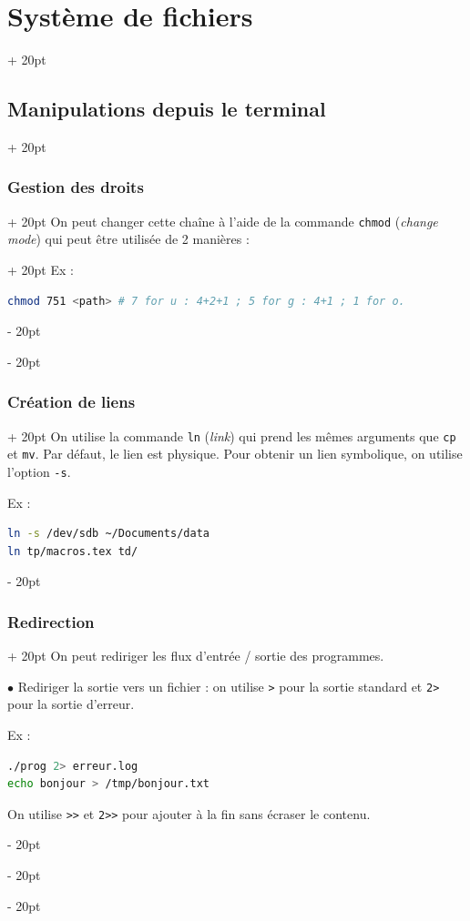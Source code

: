 \documentclass[a4paper, 12pt, twoside]{article}
\renewcommand{\em}{\color{ff4500}}
\newcommand{\ind}[1][20pt]{\advance\leftskip + #1}
\newcommand{\deind}[1][20pt]{\advance\leftskip - #1}
\newenvironment{indentedenv}[1][20pt]{\par \ind[#1]}{\par \deind}
\newenvironment{indt}[2][20pt]{#2 \begin{indentedenv}[#1]}{\end{indentedenv}} %
\begin{document}
\begin{indt}{\section{Système de fichiers}}
\begin{indt}{\subsection{Manipulations depuis le terminal}}
\begin{indt}{\subsubsection{Gestion des droits}}
\begin{indt}{On peut changer cette chaîne à l'aide de la commande \texttt{\em chmod} (\textit{change mode}) qui peut être utilisée de 2 manières :}
                    Ex :
                    \begin{lstlisting}[language=Bash, xleftmargin=100pt]
chmod 751 <path> # 7 for u : 4+2+1 ; 5 for g : 4+1 ; 1 for o.\end{lstlisting}
                \end{indt}
            \end{indt}
            
            \vspace{12pt}
            
            \begin{indt}{\subsubsection{Création de liens}}
                On utilise la commande \texttt{\em ln} (\textit{link}) qui prend les mêmes arguments que \texttt{cp} et \texttt{mv}.
                Par défaut, le lien est physique. Pour obtenir un lien symbolique, on utilise l'option \texttt{-s}.
                
                Ex :
                \begin{lstlisting}[language=Bash, xleftmargin=80pt]
ln -s /dev/sdb ~/Documents/data
ln tp/macros.tex td/\end{lstlisting}
            \end{indt}
            
            \vspace{12pt}
            
            \begin{indt}{\subsubsection{Redirection}}
                On peut rediriger les flux d'entrée / sortie des programmes.
                
                $\bullet$ Rediriger la sortie vers un fichier : on utilise \texttt > pour la sortie standard et \texttt{2>} pour la sortie d'erreur.
                
                Ex :
                \begin{lstlisting}[language=Bash, xleftmargin=80pt]
./prog 2> erreur.log
echo bonjour > /tmp/bonjour.txt\end{lstlisting}
                
                On utilise \texttt{>>} et \texttt{2>>} pour ajouter à la fin sans écraser le contenu.
                

\end{indt}
\end{indt}
\end{indt}
\end{document}
